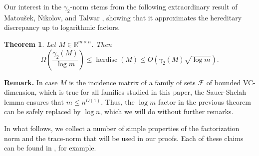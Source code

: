 \documentclass[11pt]{article}
\theoremstyle{plain}
\newtheorem{theorem}{Theorem}[section]
\theoremstyle{definition}
\DeclareMathOperator{\herdisc}{herdisc}
\begin{document}
	Our interest in the $\gamma_2$-norm stems from the following extraordinary result of Matou\v{s}ek, Nikolov, and Talwar \cite{MNT}, showing that it approximates the hereditary discrepancy up to logarithmic factors. 
	
	\begin{theorem}\label{lemma:gamma_herdisc}
		Let $M\in\mathbb{R}^{m\times n}$. Then
		$$\Omega\left(\frac{\gamma_2(M)}{\log m}\right)\leq \herdisc(M)\leq  O(\gamma_2(M)\sqrt{\log m}).$$
	\end{theorem}
	
	\noindent
	\textbf{Remark.} In case $M$ is the incidence matrix of a family of sets $\mathcal{F}$ of bounded VC-dimension, which is true for all families studied in this paper, the Sauer-Shelah lemma ensures that $m\leq n^{O(1)}$. Thus, the $\log m$ factor in the previous theorem can be safely replaced by $\log n$, which we will do without further remarks.
	
	\bigskip
	
	In what follows, we collect a number of simple properties of the factorization norm and the trace-norm that will be used in our proofs. Each of these claims can be found in \cite{BHT}, for example.
	
\end{document}
